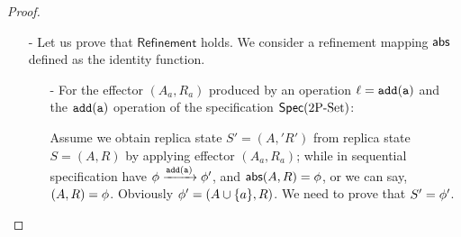 \begin {proof}
\begin{itemize}
    \begin{itemize}
    \setlength{\itemsep}{0.5pt}
    \item[-] For case when replica $\arep$ do generator of an operation $\alabel = \alabelshort[{\tt write}]{a}$ and then apply its effector: Let $S=(A,R)$ and $S'=(A',R')$ be the replica state of replica $\arep$ of $\aglobalstate$ and $\aglobalstate'$, respectively. Obviously, $(A',R') = (A \cup \{ a \},R)$, and $(A',R')$ is the effector of $\alabel$.

        By Annotation2 of replica state $S$, we can see that Annotation1 of effector $(A',R')$ holds, and Annotation2 of replica state $S'$ holds.

    \item[-] For case when replica $\arep$ apply effector $(A_a,R_a)$ of an operation $\alabel = \alabelshort[{\tt write}]{a}$ originated in a different replica: We only need to prove Annotation2. Let $S=(A,R)$ and $S'=(A',R')$ be the replica state of replica $\arep$ of $\aglobalstate$ and $\aglobalstate'$, respectively.

        By the causal delivery assumption, if $\alabel$ is visible to an operation $\alabel'$, then the effector of $\alabel'$ has not been applied in $\aglobalstate'$ yet; if an operation $\alabel''$ is visible to $\alabel$, then the effector of $\alabel''$ has already been applied in $\aglobalstate'$. By Annotation1 of effector $(A_a,R_a)$, and Annotation2 of replica state $S$, we can see that $A_a \setminus \{ a \} \subseteq A$ and $R_a \subseteq R$, and thus, we can see that $A' = A \cup \{ a \}$ and $R' = R$. Therefore, Annotation2 holds for replica state $S'$.

    \item[-] The cases of $\alabelshort[{\tt remove}]{a}$ can be similarly proved.
    \end{itemize}

\item[-] Let us prove that $\mathsf{Refinement}$ holds. We consider a refinement mapping $\mathsf{abs}$ defined as the identity function.

    \begin{itemize}
    \setlength{\itemsep}{0.5pt}
    \item[-] For the effector $(A_a,R_a)$ produced by an operation $\alabel = \alabelshort[{\tt add}]{a}$ and the $\alabelshort[{\tt add}]{a}$ operation of the specification $\mathsf{Spec}(\text{2P\text{-}Set})$:

    Assume we obtain replica state $S' = (A,'R')$ from replica state $S = (A,R)$ by applying effector $(A_a,R_a)$; while in sequential specification have $\abstate \xrightarrow{\alabelshort[{\tt add}]{a}} \abstate'$, and $\mathsf{abs}(A,R) = \phi$, or we can say, $(A,R) = \phi$. Obviously $\phi' = (A \cup \{ a \},R)$. We need to prove that $S' = \phi'$.


\end{itemize}
\end{itemize}
\end{proof}
